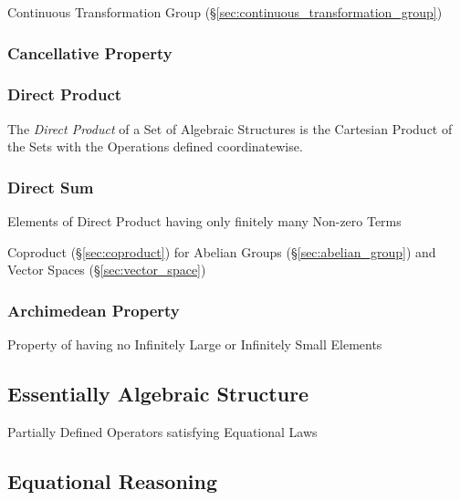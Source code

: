 Continuous Transformation Group
(\S\ref{sec:continuous_transformation_group})



\subsubsection{Cancellative Property}\label{sec:cancellative_property}

\subsubsection{Direct Product}\label{sec:direct_product}

The \emph{Direct Product} of a Set of Algebraic Structures is the
Cartesian Product of the Sets with the Operations defined
coordinatewise.



\subsubsection{Direct Sum}\label{sec:direct_sum}

Elements of Direct Product having only finitely many Non-zero Terms

Coproduct (\S\ref{sec:coproduct}) for Abelian Groups
(\S\ref{sec:abelian_group}) and Vector Spaces
(\S\ref{sec:vector_space})



\subsubsection{Archimedean Property}\label{sec:archimedean_property}

Property of having no Infinitely Large or Infinitely Small Elements



\subsection{Essentially Algebraic Structure}
\label{sec:essentially_algebraic}

Partially Defined Operators satisfying Equational Laws



\subsection{Equational Reasoning}\label{sec:equational_reasoning}

